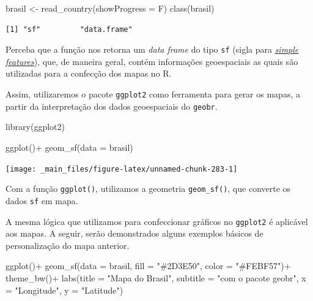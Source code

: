 \documentclass[
  brazilian,
]{book}
\newenvironment{Shaded}{\begin{snugshade}}{\end{snugshade}}
\newcommand{\AttributeTok}[1]{\textcolor[rgb]{0.77,0.63,0.00}{#1}}
\newcommand{\FunctionTok}[1]{\textcolor[rgb]{0.00,0.00,0.00}{#1}}
\newcommand{\NormalTok}[1]{#1}
\newcommand{\OtherTok}[1]{\textcolor[rgb]{0.56,0.35,0.01}{#1}}
\newcommand{\SpecialCharTok}[1]{\textcolor[rgb]{0.00,0.00,0.00}{#1}}
\newcommand{\StringTok}[1]{\textcolor[rgb]{0.31,0.60,0.02}{#1}}
\begin{document}
\begin{Shaded}
\begin{Highlighting}[]
\NormalTok{brasil }\OtherTok{\textless{}{-}} \FunctionTok{read\_country}\NormalTok{(}\AttributeTok{showProgress =}\NormalTok{ F)}
\FunctionTok{class}\NormalTok{(brasil)}
\end{Highlighting}
\end{Shaded}

\begin{verbatim}
[1] "sf"         "data.frame"
\end{verbatim}

Perceba que a função nos retorna um \emph{data frame} do tipo \texttt{sf} (sigla para \href{https://r-spatial.github.io/sf/articles/sf1.html}{\emph{simple features}}), que, de maneira geral, contém informações geoespaciais as quais são utilizadas para a confecção dos mapas no R.

Assim, utilizaremos o pacote \texttt{ggplot2} como ferramenta para gerar os mapas, a partir da interpretação dos dados geoespaciais do \texttt{geobr}.

\begin{Shaded}
\begin{Highlighting}[]
\FunctionTok{library}\NormalTok{(ggplot2)}
\end{Highlighting}
\end{Shaded}

\begin{Shaded}
\begin{Highlighting}[]
\FunctionTok{ggplot}\NormalTok{()}\SpecialCharTok{+}
  \FunctionTok{geom\_sf}\NormalTok{(}\AttributeTok{data =}\NormalTok{ brasil)}
\end{Highlighting}
\end{Shaded}

\begin{center}\texttt{[image: \_main\_files/figure-latex/unnamed-chunk-283-1]} \end{center}

Com a função \texttt{ggplot()}, utilizamos a geometria \texttt{geom\_sf()}, que converte os dados \texttt{sf} em mapa.

A mesma lógica que utilizamos para confeccionar gráficos no \texttt{ggplot2} é aplicável aos mapas. A seguir, serão demonstrados alguns exemplos básicos de personalização do mapa anterior.

\begin{Shaded}
\begin{Highlighting}[]
\FunctionTok{ggplot}\NormalTok{()}\SpecialCharTok{+}
  \FunctionTok{geom\_sf}\NormalTok{(}\AttributeTok{data =}\NormalTok{ brasil,}
          \AttributeTok{fill =} \StringTok{"\#2D3E50"}\NormalTok{,}
          \AttributeTok{color =} \StringTok{"\#FEBF57"}\NormalTok{)}\SpecialCharTok{+}
  \FunctionTok{theme\_bw}\NormalTok{()}\SpecialCharTok{+}
  \FunctionTok{labs}\NormalTok{(}\AttributeTok{title =} \StringTok{"Mapa do Brasil"}\NormalTok{,}
       \AttributeTok{subtitle =} \StringTok{"com o pacote geobr"}\NormalTok{,}
       \AttributeTok{x =} \StringTok{"Longitude"}\NormalTok{,}
       \AttributeTok{y =} \StringTok{"Latitude"}\NormalTok{)}
\end{Highlighting}
\end{Shaded}
\end{document}
